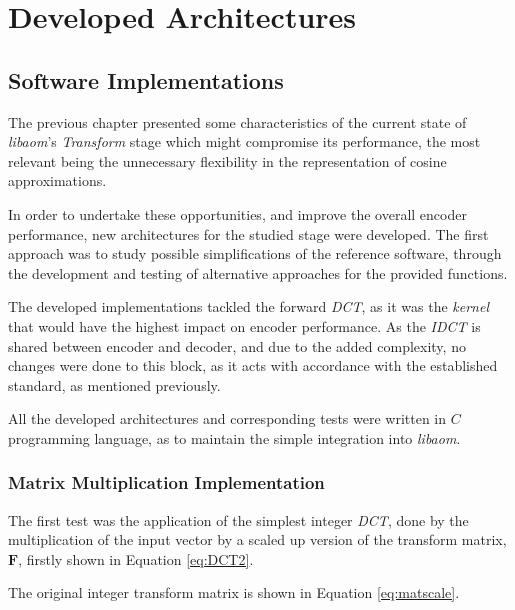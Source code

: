 \cleardoublepage
\chapter{Developed Architectures}

\section{Software Implementations}

The previous chapter presented some characteristics of the current state of \emph{libaom}'s \emph{Transform} stage which might compromise its performance, the most relevant being the unnecessary flexibility in the representation of cosine approximations.

In order to undertake these opportunities, and improve the overall encoder performance, new architectures for the studied stage were developed. The first approach was to study possible simplifications of the reference software, through the development and testing of alternative approaches for the provided functions.

The developed implementations tackled the forward \emph{DCT}, as it was the \emph{kernel} that would have the highest impact on encoder performance. As the \emph{IDCT} is shared between encoder and decoder, and due to the added complexity, no changes were done to this block, as it acts with accordance with the established standard, as mentioned previously. 

All the developed architectures and corresponding tests were written in $C$ programming language, as to maintain the simple integration into \emph{libaom}.

\subsection{Matrix Multiplication Implementation}

The first test was the application of the simplest integer \emph{DCT}, done by the multiplication of the input vector by a scaled up version of the transform matrix, $\mathbf{F}$, firstly shown in Equation \ref{eq:DCT2}. 

The original integer transform matrix is shown in Equation \ref{eq:matscale}.

